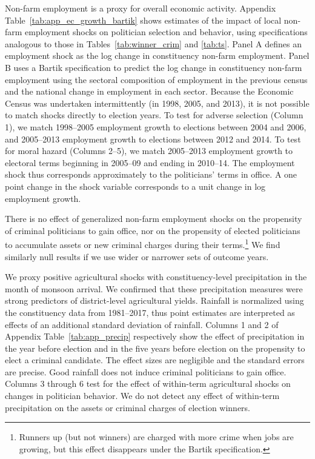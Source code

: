 \documentclass[12pt,letterpaper]{article}
\begin{document}
Non-farm employment is a proxy for overall economic activity.  Appendix
Table~\ref{tab:app_ec_growth_bartik} shows estimates of the impact of
local non-farm employment shocks on politician selection and behavior,
using specifications analogous to those in
Tables~\ref{tab:winner_crim} and \ref{tab:ts}. Panel A defines an
employment shock as the log change in constituency non-farm
employment. Panel B uses a Bartik \citeyear{Bartik1991} specification
to predict the log change in constituency non-farm employment using
the sectoral composition of employment in the previous census and the
national change in employment in each sector. Because the Economic
Census was undertaken intermittently (in 1998, 2005, and 2013), it is
not possible to match shocks directly to election years. To test for
adverse selection (Column 1), we match 1998--2005 employment growth to
elections between 2004 and 2006, and 2005--2013 employment growth to
elections between 2012 and 2014. To test for moral hazard (Columns
2--5), we match 2005--2013 employment growth to electoral terms
beginning in 2005--09 and ending in 2010--14. The employment shock
thus corresponds approximately to the politicians' terms in office. A
one point change in the shock variable corresponds to a unit change in
log employment growth.

There is no effect of generalized non-farm employment shocks on the
propensity of criminal politicians to gain office, nor on the
propensity of elected politicians to accumulate assets or new criminal
charges during their terms.\footnote{Runners up (but not winners) are
  charged with more crime when jobs are growing, but this effect
  disappears under the Bartik specification.} We find similarly null
results if we use wider or narrower sets of outcome years.

We proxy positive agricultural shocks with constituency-level
precipitation in the month of monsoon arrival. We confirmed that these
precipitation measures were strong predictors of district-level
agricultural yields. Rainfall is normalized using the constituency
data from 1981--2017, thus point estimates are interpreted as effects
of an additional standard deviation of rainfall. Columns 1 and 2 of
Appendix Table~\ref{tab:app_precip} respectively show the effect of
precipitation in the year before election and in the five years before
election on the propensity to elect a criminal candidate. The effect
sizes are negligible and the standard errors are precise. Good
rainfall does not induce criminal politicians to gain office. Columns
3 through 6 test for the effect of within-term agricultural shocks on
changes in politician behavior. We do not detect any effect of
within-term precipitation on the assets or criminal charges of
election winners.
\end{document}
